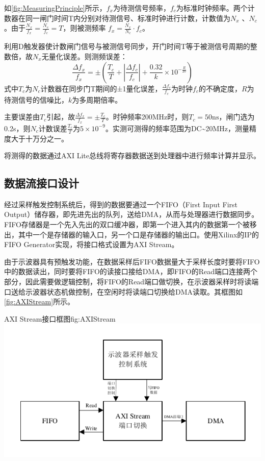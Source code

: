 \documentclass[supercite]{HustGraduPaper}
\begin{document}
	如\autoref{fig:MeasuringPrinciple}所示，$ f_x $为待测信号频率，$ f_c $为标准时钟频率。两个计数器在同一闸门时间T内分别对待测信号、标准时钟进行计数，计数值为$ N_x $ 、$ N_c $。由于$ \frac{N_x}{f_x} = \frac{N_c}{f_c} = T $，则被测频率 $ f_x=\frac{N_x}{N_c} \cdot f_c $。
	
	利用D触发器使计数闸门信号与被测信号同步，开门时间T等于被测信号周期的整数倍，故$ N_x $无量化误差。则测频误差：
	\begin{equation}
	\frac{\Delta f_{x}}{f_{x}}=\pm\left(\frac{T_c}{T}+\left|\frac{\Delta f_{c}}{f_{c}}\right|+\frac{0.32}{k} \times 10^{-\frac{R}{20}}\right)
	\end{equation}
	式中$T_c$为$ N_c $计数器在同步门T期间的±1量化误差，$ \frac{\Delta f_{c}}{f_{c}} $为时钟$ f_c $的不确定度，$ R $为待测信号的信噪比，$ k $为多周期倍率。
	
	主要误差由$ T_c $引起，故$ \frac{\Delta f_{x}}{f_{x}}=\pm \frac{T_c}{T} $。时钟频率200MHz时，则$ T_c=50\mathrm{ns}  $，闸门选为0.2s，则$ N_c $计数误差$ \frac{T_c}{T} $为$ 5\times 10^{-9}  $。实测可测得的频率范围为DC\textasciitilde20MHz，测量精度大于十万分之一。
	
	将测得的数据通过AXI Lite总线将寄存器数据送到处理器中进行频率计算并显示。	
	
	\subsection{数据流接口设计}
	
	经过采样触发控制系统后，得到的数据要通过一个FIFO（First Input First Output）储存器，即先进先出的队列，送给DMA，从而与处理器进行数据同步。FIFO存储器是一个先入先出的双口缓冲器，即第一个进入其内的数据第一个被移出，其中一个是存储器的输入口，另一个口是存储器的输出口。使用Xilinx的IP的FIFO Generator实现，将接口格式设置为AXI Stream。
	
	由于示波器具有预触发功能，在数据采样后FIFO数据量大于采样长度时要将FIFO中的数据读出，同时要将FIFO的读接口接给DMA，即FIFO的Read端口连接两个部分，因此需要做逻辑控制，将FIFO的Read端口做切换，在示波器采样时将读端口送给示波器状态机做控制，在空闲时将读端口切换给DMA读取。其框图如\autoref{fig:AXIStream}所示。
	\begin{generalfig}[htb]{AXI Stream接口框图}{fig:AXIStream}
		\includegraphics[width=\textwidth]{Figures/AXIStream.pdf}
	\end{generalfig}
	
\end{document}
